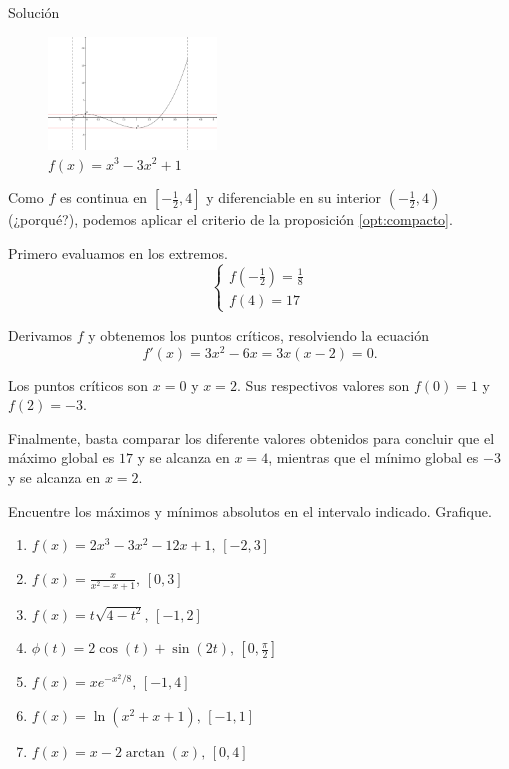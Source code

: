 {Solución}
    
    \begin{figure}
        \centering
        \includegraphics[height=3cm,keepaspectratio=true]{./calculo/optimizacion.png}
        \caption{$f(x)=x^3-3x^2+1$}
        \label{fig:optimizacion}
    \end{figure}



    Como $f$ es continua en $[-\frac{1}{2},4]$ y diferenciable en su interior $(-\frac{1}{2},4)$ (¿porqué?), podemos
    aplicar el criterio de la proposición \ref{opt:compacto}.
    
    
    
    Primero evaluamos en los extremos.
    $$
    \begin{cases}
        f(-\frac{1}{2})=\frac{1}{8} \\
        f(4)=17
    \end{cases}
    $$
    
    Derivamos $f$ y obtenemos los puntos críticos, resolviendo la ecuación
    $$
    f'(x)=3x^{2}-6x=3x(x-2)=0.
    $$
    
    Los puntos críticos son $x=0$ y $x=2.$ Sus respectivos valores son $f(0)=1$ y $f(2)=-3.$
    
    Finalmente, basta comparar los diferente valores obtenidos para concluir que el máximo global es $17$ y se alcanza en
    $x=4$, mientras que el mínimo global es $-3$ y se alcanza en $x=2.$
    
    


    
    \begin{problema}
        Encuentre los máximos y mínimos absolutos en el intervalo indicado. Grafique.
        \begin{enumerate}
            \item $f(x)=2x^{3}-3x^{2}-12x+1, \, [-2,3]$
            \item $f(x)=\frac{x}{x^{2}-x+1}, \, [0,3]$
            \item $f(x)=t\sqrt{4-t^{2}}, \, [-1,2]$
            \item $\phi(t)=2\cos(t)+\sin(2t), \, [0, \frac{\pi}{2}]$
            \item $f(x)=xe^{-x^{2}/8}, \, [-1,4]$
            \item $f(x)=\ln(x^{2}+x+1), \, [-1,1]$
            \item $f(x)=x-2\arctan(x), \, [0,4]$
        \end{enumerate}
        
    \end{problema}


